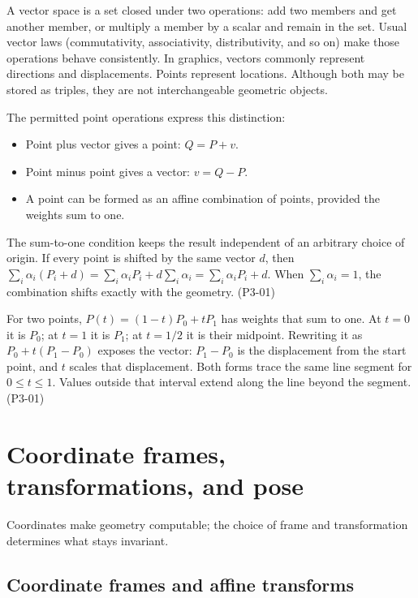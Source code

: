 A vector space is a set closed under two operations: add two members and get another member, or multiply a member by a scalar and remain in the set. Usual vector laws (commutativity, associativity, distributivity, and so on) make those operations behave consistently. In graphics, vectors commonly represent directions and displacements. Points represent locations. Although both may be stored as triples, they are not interchangeable geometric objects.

The permitted point operations express this distinction:

\begin{itemize}
\tightlist
\item
  Point plus vector gives a point: \(Q=P+v\).
\item
  Point minus point gives a vector: \(v=Q-P\).
\item
  A point can be formed as an affine combination of points, provided the weights sum to one.
\end{itemize}

The sum-to-one condition keeps the result independent of an arbitrary choice of origin. If every point is shifted by the same vector \(d\), then \(\sum_i\alpha_i(P_i+d)=\sum_i\alpha_iP_i+d\sum_i\alpha_i=\sum_i\alpha_iP_i+d\). When \(\sum_i\alpha_i=1\), the combination shifts exactly with the geometry. (P3-01)

For two points, \(P(t)=(1-t)P_0+tP_1\) has weights that sum to one. At \(t=0\) it is \(P_0\); at \(t=1\) it is \(P_1\); at \(t=1/2\) it is their midpoint. Rewriting it as \(P_0+t(P_1-P_0)\) exposes the vector: \(P_1-P_0\) is the displacement from the start point, and \(t\) scales that displacement. Both forms trace the same line segment for \(0\leq t\leq1\). Values outside that interval extend along the line beyond the segment. (P3-01)

\section{Coordinate frames, transformations, and pose}\label{03-visual-computing-i-ch001-coordinate-frames-transformations-and-pose}

Coordinates make geometry computable; the choice of frame and transformation determines what stays invariant.

\subsection{Coordinate frames and affine transforms}\label{03-visual-computing-i-ch001-coordinate-frames-and-affine-transforms}

